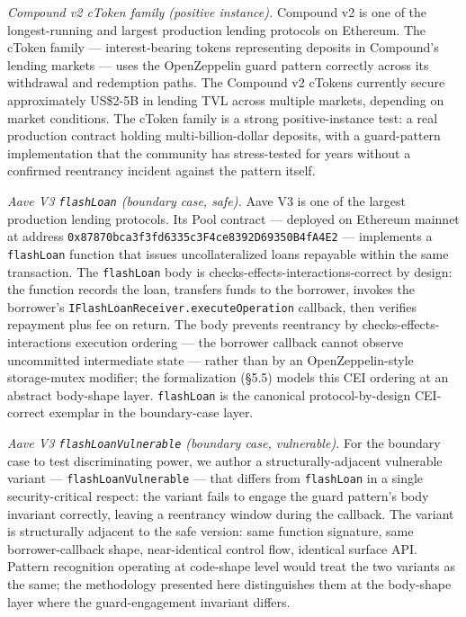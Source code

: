 \emph{Compound v2 cToken family (positive instance).} Compound v2 is one
of the longest-running and largest production lending protocols on
Ethereum. The cToken family --- interest-bearing tokens representing
deposits in Compound's lending markets --- uses the OpenZeppelin guard
pattern correctly across its withdrawal and redemption paths. The
Compound v2 cTokens currently secure approximately US\$2-5B in lending
TVL across multiple markets, depending on market conditions. The cToken
family is a strong positive-instance test: a real production contract
holding multi-billion-dollar deposits, with a guard-pattern
implementation that the community has stress-tested for years without a
confirmed reentrancy incident against the pattern itself.

\emph{Aave V3 \texttt{flashLoan} (boundary case, safe).} Aave V3 is one
of the largest production lending protocols. Its Pool contract ---
deployed on Ethereum mainnet at address
\texttt{0x87870bca3f3fd6335c3F4ce8392D69350B4fA4E2} --- implements a
\texttt{flashLoan} function that issues uncollateralized loans repayable
within the same transaction. The \texttt{flashLoan} body is
checks-effects-interactions-correct by design: the function records the
loan, transfers funds to the borrower, invokes the borrower's
\texttt{IFlashLoanReceiver.executeOperation} callback, then verifies
repayment plus fee on return. The body prevents reentrancy by
checks-effects-interactions execution ordering --- the borrower callback
cannot observe uncommitted intermediate state --- rather than by an
OpenZeppelin-style storage-mutex modifier; the formalization (§5.5)
models this CEI ordering at an abstract body-shape layer.
\texttt{flashLoan} is the canonical protocol-by-design CEI-correct
exemplar in the boundary-case layer.

\emph{Aave V3 \texttt{flashLoanVulnerable} (boundary case, vulnerable).}
For the boundary case to test discriminating power, we author a
structurally-adjacent vulnerable variant ---
\texttt{flashLoanVulnerable} --- that differs from \texttt{flashLoan} in
a single security-critical respect: the variant fails to engage the
guard pattern's body invariant correctly, leaving a reentrancy window
during the callback. The variant is structurally adjacent to the safe
version: same function signature, same borrower-callback shape,
near-identical control flow, identical surface API. Pattern recognition
operating at code-shape level would treat the two variants as the same;
the methodology presented here distinguishes them at the body-shape
layer where the guard-engagement invariant differs.

